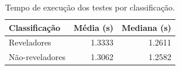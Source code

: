 \begin{table}[ht]
\centering
\caption{Tempo de execução dos testes por classificação.}
\label{tab:execution-time-classification}
\begin{tabular}{lrr}
\hline
Classificação & Média (s) & Mediana (s) \\
\hline
Reveladores & 1.3333 & 1.2611 \\
Não-reveladores & 1.3062 & 1.2582 \\
\hline
\end{tabular}
\end{table}
